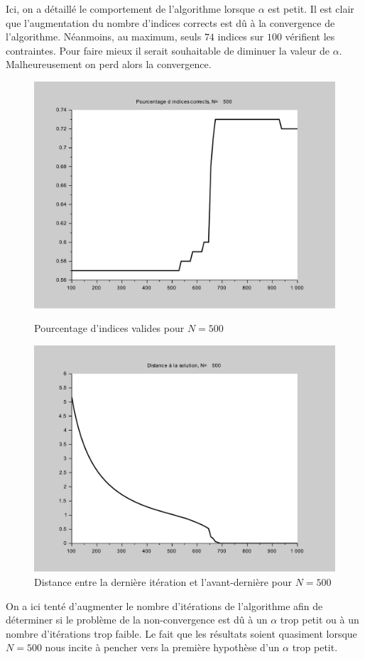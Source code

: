 \documentclass[10pt,a4paper]{article}
\begin{document}
Ici, on a détaillé le comportement de l'algorithme lorsque $\alpha$ est petit.
Il est clair que l'augmentation du nombre d'indices corrects est dû à la convergence de l'algorithme.
Néanmoins, au maximum, seuls $74$ indices sur $100$ vérifient les contraintes.
Pour faire mieux il serait souhaitable de diminuer la valeur de $\alpha$.
Malheureusement on perd alors la convergence.
\begin{figure}[H]
\centering
\begin{minipage}[b]{.46\linewidth}
\centering
\includegraphics[scale=0.3]{percent_alpha1_500.pdf}
\caption{Pourcentage d'indices valides pour $N=500$}
\end{minipage}
\begin{minipage}[b]{.46\linewidth}
\centering
\includegraphics[scale=0.3]{dist_alpha1_500.pdf}
\caption{Distance entre la dernière itération et l'avant-dernière pour $N=500$}
\end{minipage}
\end{figure}
On a ici tenté d'augmenter le nombre d'itérations de l'algorithme afin de déterminer si le problème de la non-convergence est dû à un $\alpha$ trop petit ou à un nombre d'itérations trop faible.
Le fait que les résultats soient quasiment lorsque $N=500$ nous incite à pencher vers la première hypothèse d'un $\alpha$ trop petit.
\end{document}
